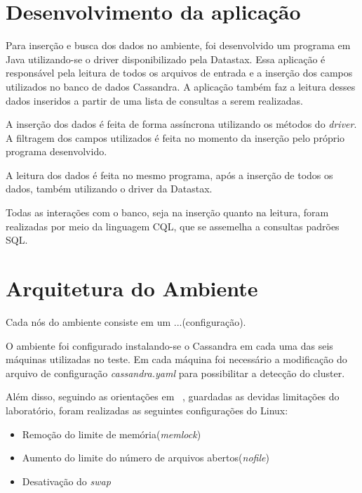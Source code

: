 \section{Desenvolvimento da aplicação}
Para inserção e busca dos dados no ambiente, foi desenvolvido um programa em Java utilizando-se o driver disponibilizado pela Datastax. Essa aplicação é responsável pela leitura de todos os arquivos de entrada e a inserção dos campos utilizados no banco de dados Cassandra. A aplicação também faz a leitura desses dados inseridos a partir de uma lista de consultas a serem realizadas.

A inserção dos dados é feita de forma assíncrona utilizando os métodos do \emph{driver}. A filtragem dos campos utilizados é feita no momento da inserção pelo próprio programa desenvolvido.

A leitura dos dados é feita no mesmo programa, após a inserção de todos os dados, também utilizando o driver da Datastax.

Todas as interações com o banco, seja na inserção quanto na leitura, foram realizadas por meio da linguagem CQL, que se assemelha a consultas padrões SQL.

\section{Arquitetura do Ambiente}
Cada nós do ambiente consiste em um ...(configuração).

O ambiente foi configurado instalando-se o Cassandra em cada uma das seis máquinas utilizadas no teste. Em cada máquina foi necessário a modificação do arquivo de configuração \emph{cassandra.yaml} para possibilitar a detecção do cluster.

Além disso, seguindo as orientações em ~\cite{cassandrasettings}, guardadas as devidas limitações do laboratório, foram realizadas as seguintes configurações do Linux:
\begin{itemize}
	\item Remoção do limite de memória(\emph{memlock})
	\item Aumento do limite do número de arquivos abertos(\emph{nofile})
	\item Desativação do \emph{swap}
\end{itemize}




